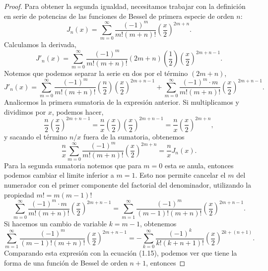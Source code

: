 \documentclass[11pt]{article}
\theoremstyle{definition}
\numberwithin{equation}{section}
\begin{document}
\begin{proof}
	Para obtener la segunda igualdad, necesitamos trabajar con la definición en serie de potencias de las funciones de Bessel de primera especie de orden $n$:
	\begin{equation}
		J_n(x) = \sum_{m=0}^{\infty} \frac{(-1)^m}{m!(m+n)!} \left(\frac{x}{2}\right)^{2m+n}.
	\end{equation}
	Calculamos la derivada,
	\begin{equation}
		J'_n(x) = \sum_{m=0}^{\infty} \frac{(-1)^m}{m!(m+n)!} (2m+n) \left( \frac{1}{2} \right) \left(\frac{x}{2}\right)^{2m+n-1}.
	\end{equation}
	Notemos que podemos separar la serie en dos por el término $(2m+n)$,
	\begin{equation}
		J'_n(x) = \sum_{m=0}^{\infty} \frac{(-1)^m}{m!(m+n)!}\left(\frac{n}{2}\right) \left(\frac{x}{2}\right)^{2m+n-1} + \sum_{m=0}^{\infty} \frac{(-1)^m\cdot m}{m!(m+n)!} \left(\frac{x}{2}\right)^{2m+n-1}.
	\end{equation}
	Analicemos la primera sumatoria de la expresión anterior. Si multiplicamos y dividimos por $x$, podemos hacer,
	\begin{equation}
		\frac{n}{2} \left(\frac{x}{2}\right)^{2m+n-1} = \frac{n}{x} \left(\frac{x}{2}\right) \left(\frac{x}{2}\right)^{2m+n-1} = \frac{n}{x} \left(\frac{x}{2}\right)^{2m+n},
	\end{equation}
	y sacando el término $n/x$ fuera de la sumatoria, obtenemos
	\begin{equation}
		\frac{n}{x} \sum_{m=0}^{\infty} \frac{(-1)^m}{m!(m+n)!} \left(\frac{x}{2}\right)^{2m+n} = \frac{n}{x} J_n(x).
	\end{equation}
	Para la segunda sumatoria notemos que para $m=0$ esta se anula, entonces podemos cambiar el limite inferior a $m=1$. Esto nos permite cancelar el $m$ del numerador con el primer componente del factorial del denominador, utilizando la propiedad $m! = m(m-1)!$
	\begin{equation}
		\sum_{m=0}^{\infty} \frac{(-1)^m\cdot m}{m!(m+n)!} \left(\frac{x}{2}\right)^{2m+n-1} = \sum_{m=1}^{\infty} \frac{(-1)^m}{(m-1)!(m+n)!} \left(\frac{x}{2}\right)^{2m+n-1}.
	\end{equation}
	Si hacemos un cambio de variable $k = m-1$, obtenemos
	\begin{equation}
		\sum_{m=1}^{\infty} \frac{(-1)^m}{(m-1)!(m+n)!} \left(\frac{x}{2}\right)^{2m+n-1} = -\sum_{k=0}^{\infty} \frac{(-1)^k}{k!(k+n+1)!} \left(\frac{x}{2}\right)^{2k+(n+1)}.
	\end{equation}
	Comparando esta expresión con la ecuación (1.15), podemos ver que tiene la forma de una función de Bessel de orden $n+1$, entonces

\end{proof}
\end{document}
